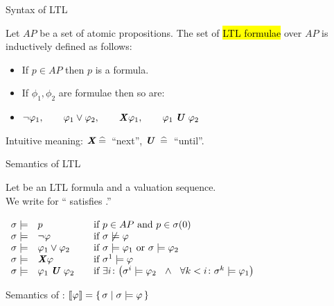 \begin{frame}{Syntax of LTL}

Let $AP$ be a set of atomic propositions. The set of \hl{LTL formulae} over $AP$ is inductively defined as follows:

\bigskip
\begin{itemize}
\itemsep1em
\item If $p\in AP$ then $p$ is a formula.

\item If $\phi_1,\phi_2$ are formulae then so are:
\item[] $\neg\phi_1, \qquad \phi_1\lor\phi_2, 
\qquad \hl{\X}\phi_1, \qquad \phi_1\hl{\U}\phi_2$
\end{itemize}

\bigskip
Intuitive meaning:
$\hl{\X}\>\widehat{=}\>$ ``next'',
$\hl{\U}\>\widehat{=}\>$ ``until''.

\end{frame}


\begin{frame}{Semantics of LTL}

Let \m{\phi} be an LTL formula and \m{\sigma} a valuation sequence.\\
We write \m{\sigma\models\phi} for ``\m{\sigma} satisfies \m{\phi}.''

 \begin{center}
  \(\begin{array}[t]{rl@{\hskip2em}l}
    \sigma\models & p & \hbox{if \m{p\in AP} and $p\in \sigma(0)$} \\
    \sigma\models & \neg\phi & \hbox{if $\sigma\not\models\phi$}\\
    \sigma\models & \phi_1\lor\phi_2 & \hbox{if
  $\sigma\models\phi_1$ or $\sigma\models\phi_2$}\\
    \sigma\models & \hl{\X}\phi & \hbox{if $\sigma^1\models\phi$}\\
    \sigma\models & \phi_1\hl{\U}\phi_2 & \hbox{if \m{\exists i\colon
    \big(\sigma^i\models\phi_2
   \ \ \land \ \ \forall k<i\colon \sigma^k\models\phi_1\big)}}\\
    \end{array}\)
\end{center}

\bigskip
Semantics of \m{\phi}: \qquad
  $\llbracket \varphi \rrbracket = \{\,\sigma\mid\sigma\models\varphi\,\}$

\end{frame}

